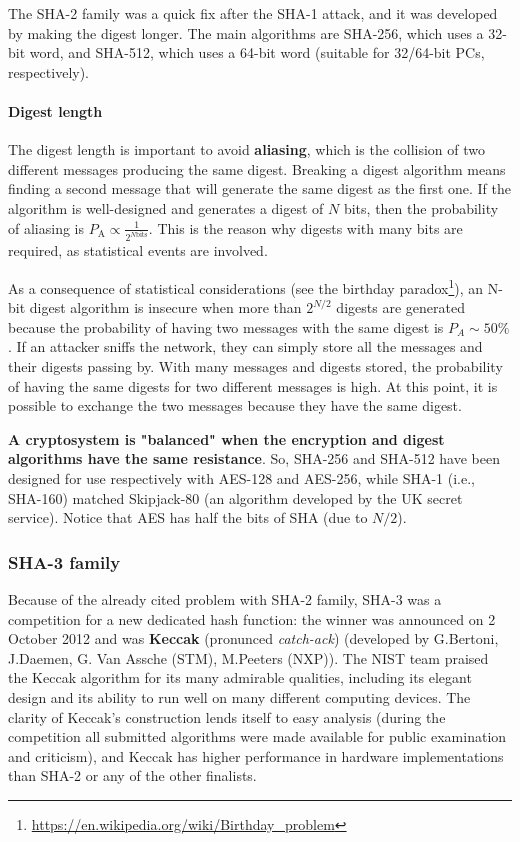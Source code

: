 The SHA-2 family was a quick fix after the SHA-1 attack, and it was developed by making the digest longer. The main algorithms are SHA-256, which uses a 32-bit word, and SHA-512, which uses a 64-bit word (suitable for 32/64-bit PCs, respectively).

\paragraph*{Digest length}
The digest length is important to avoid \textbf{aliasing}, which is the collision of two different messages producing the same digest. Breaking a digest algorithm means finding a second message that will generate the same digest as the first one. If the algorithm is well-designed and generates a digest of \(N\) bits, then the probability of aliasing is \(P_{\text{A}} \propto \frac{1}{2^{N \text{bits}}}\).
This is the reason why digests with many bits are required, as statistical events are involved.

As a consequence of statistical considerations (see the birthday paradox\footnote{\url{https://en.wikipedia.org/wiki/Birthday_problem}}), an N-bit digest algorithm is insecure when more than \(2^{N/2}\) digests are generated because the probability of having two messages with the same digest is \(P_{A} \sim 50\%\). If an attacker sniffs the network, they can simply store all the messages and their digests passing by. With many messages and digests stored, the probability of having the same digests for two different messages is high. At this point, it is possible to exchange the two messages because they have the same digest.

\textbf{A cryptosystem is "balanced" when the encryption and digest algorithms have the same resistance}. So, SHA-256 and SHA-512 have been designed for use respectively with AES-128 and AES-256, while SHA-1 (i.e., SHA-160) matched Skipjack-80 (an algorithm developed by the UK secret service). Notice that AES has half the bits of SHA (due to $N/2$).


\subsubsection{SHA-3 family}
Because of the already cited problem with SHA-2 family, SHA-3 was a competition for a new dedicated hash
function: the winner was announced on 2 October 2012 and was \textbf{Keccak} (pronunced \textit{catch-ack}) (developed by G.Bertoni, J.Daemen, G. Van Assche (STM), M.Peeters (NXP)).
The NIST team praised the Keccak algorithm for its many admirable qualities, including its elegant design and its ability to run well on many different computing devices.
The clarity of Keccak's construction lends itself to easy analysis (during the competition all submitted algorithms
were made available for public examination and criticism), and Keccak has higher performance in hardware
implementations than SHA-2 or any of the other finalists.

